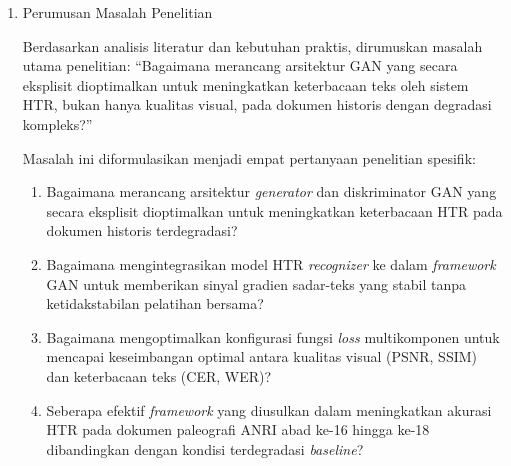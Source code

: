 \documentclass[12pt,a4paper]{article}
\begin{document}
\begin{enumerate}[label=\arabic*., leftmargin=*, nosep]
\begin{enumerate}[label=(\alph*), leftmargin=*, nosep]
\item \textit{Kesenjangan Arsitektural---Evaluasi Single-Modal:} Diskriminator yang ada hanya mengevaluasi kualitas visual (single-modal CNN), tanpa eksplorasi arsitektur dual-modal yang dapat menangkap koherensi tekstual melalui jalur sekuensial (LSTM). Meskipun kontribusi empirisnya perlu divalidasi, eksplorasi ini penting untuk melengkapi pemahaman teoretis tentang evaluasi bilateral visual-tekstual dalam konteks GAN berorientasi HTR.

\item \textit{Kesenjangan Evaluasi---Optimasi Loss Function:} Tidak ada studi ablasi sistematis yang mengidentifikasi konfigurasi optimal untuk menyeimbangkan komponen \textit{loss function} (piksel, \textit{adversarial}, perseptual, CTC) guna mencapai keseimbangan Pareto antara kualitas visual dan keterbacaan HTR.
\end{enumerate}

\item Perumusan Masalah Penelitian

Berdasarkan analisis literatur dan kebutuhan praktis, dirumuskan masalah utama penelitian: ``Bagaimana merancang arsitektur GAN yang secara eksplisit dioptimalkan untuk meningkatkan keterbacaan teks oleh sistem HTR, bukan hanya kualitas visual, pada dokumen historis dengan degradasi kompleks?''

Masalah ini diformulasikan menjadi empat pertanyaan penelitian spesifik:

\begin{enumerate}[label=RQ\arabic*:, leftmargin=*, nosep]
\item Bagaimana merancang arsitektur \textit{generator} dan diskriminator GAN yang secara eksplisit dioptimalkan untuk meningkatkan keterbacaan HTR pada dokumen historis terdegradasi?

\item Bagaimana mengintegrasikan model HTR \textit{recognizer} ke dalam \textit{framework} GAN untuk memberikan sinyal gradien sadar-teks yang stabil tanpa ketidakstabilan pelatihan bersama?

\item Bagaimana mengoptimalkan konfigurasi fungsi \textit{loss} multikomponen untuk mencapai keseimbangan optimal antara kualitas visual (PSNR, SSIM) dan keterbacaan teks (CER, WER)?

\item Seberapa efektif \textit{framework} yang diusulkan dalam meningkatkan akurasi HTR pada dokumen paleografi ANRI abad ke-16 hingga ke-18 dibandingkan dengan kondisi terdegradasi \textit{baseline}?
\end{enumerate}
\end{enumerate}
\end{document}
